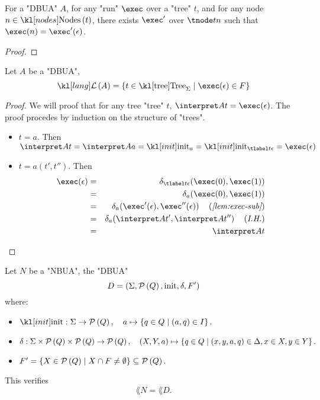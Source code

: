 \documentclass{article}
\begin{document}
\begin{lemma}\label{lem:exec-sub}
	For a "DBUA" $A$, for any "run" $\exec$ over a "tree" $t$, and for any node $n \in \nodes t$, there exists $\exec'$ over
	$\tnode t n$ such that $\exec (n) = \exec'(\epsilon)$.
\end{lemma}

\begin{proof}
	\todo{}
\end{proof}

\begin{lemma}
	Let $A$ be a "DBUA",
	\[ \lang A = \setdef {t \in \tree_{\Sigma}} {\exec (\epsilon) \in F} \]
\end{lemma}

\begin{proof}
	We will proof that for any tree "tree" $t$, $\interpret A t = \exec (\epsilon)$.
	The proof procedes by induction on the structure of "trees".
	\begin{itemize}
		\item $t = a$. Then
		      $\interpret A t = \interpret A a = \init_a = \init_{\tlabel t {\epsilon}} = \exec (\epsilon)$
		\item $t = a(t',t'')$. Then
		      \begin{eqnarray*}
			      \exec (\epsilon)  &=& \delta_{\tlabel t {\epsilon}}(\exec (0), \exec (1)) \\
			      &=& \delta_a (\exec (0), \exec (1)) \\
			      &=& \delta_a (\exec' (\epsilon), \exec''  (\epsilon))  \reason{\ref{lem:exec-sub}}\\
			      &=& \delta_a (\interpret A {t'}, \interpret A {t''}) \reason{I.H.}\\
			      &=& \interpret A t
		      \end{eqnarray*}
	\end{itemize}
\end{proof}

\begin{theorem}
	\begin{theorem}
		Let $N$ be a "NBUA", the "DBUA"
		\[
			D = (\Sigma, \mathcal{P}\left(Q\right), \text{init}, \delta, F' )
		\]
		where:

		\begin{itemize}
			\setlength{\itemsep}{0pt} %
			\item $ \init : \Sigma \to \parts Q, \quad a \mapsto \setdef{q \in Q}{(a,q) \in I}. $
			\item $ \delta : \Sigma \times \mathcal{P}\left(Q\right) \times \mathcal{P}\left(Q\right) \to \mathcal{P}\left(Q\right), \quad (X, Y, a) \mapsto \left\{q \in Q \mid (x,y,a,q) \in \Delta, x \in X, y \in Y\right\}. $
			\item $ F' = \left\{X \in \mathcal{P}\left(Q\right) \mid X \cap F \neq \emptyset\right\} \subseteq \mathcal{P}\left(Q\right). $
		\end{itemize}

		This verifies
		\[
			\lang N = \lang D.
		\]
	\end{theorem}
\end{theorem}
\end{document}
